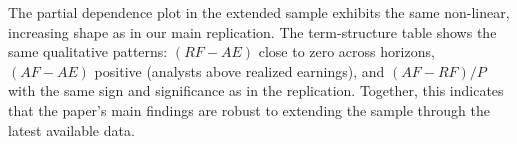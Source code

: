 \documentclass[11pt]{article}
\begin{document}
The partial dependence plot in the extended sample exhibits the same non-linear, increasing shape as in our main replication. The term-structure table shows the same qualitative patterns: $(RF-AE)$ close to zero across horizons, $(AF-AE)$ positive (analysts above realized earnings), and $(AF-RF)/P$ with the same sign and significance as in the replication. Together, this indicates that the paper's main findings are robust to extending the sample through the latest available data.
\end{document}
